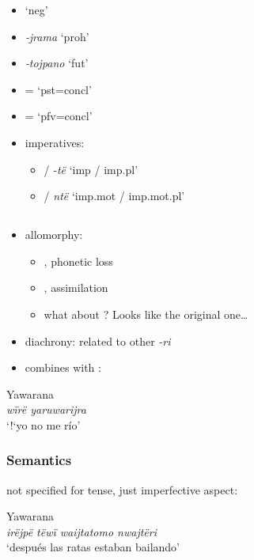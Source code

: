 \documentclass{memoir}
\begin{document}
\begin{itemize}
\item
   `neg'
\item
  \emph{‑jrama} `proh'
\item
  \emph{‑tojpano} `fut'
\item
  = `pst=concl'
\item
  = `pfv=concl'
\item
  imperatives:

  \begin{itemize}
  \tightlist
  \item
     / ‑\emph{të} `imp / imp.pl'
  \item
     / \emph{ntë} `imp.mot / imp.mot.pl'
  \end{itemize}
\end{itemize}

\subsection{\texorpdfstring{}{}}

\begin{itemize}
\tightlist
\item
  allomorphy:

  \begin{itemize}
  \tightlist
  \item
    , phonetic loss
  \item
    , assimilation
  \item
    what about ? Looks like the original one\ldots{}
  \end{itemize}
\item
  diachrony: related to other \emph{-ri}
\item
  combines with :
\end{itemize}

\ex Yawarana \\
\label{convrisamaj-04}    \textit{wïrë yaruwarijra }\\
        ‘!‘yo no me río’ \xe

\subsubsection{Semantics}

not specified for tense, just imperfective aspect:

\ex Yawarana \\
\label{ctorat-16}    \textit{irëjpë tëwï waijtatomo nwajtëri }\\
        ‘después las ratas estaban bailando’ \xe
\end{document}
